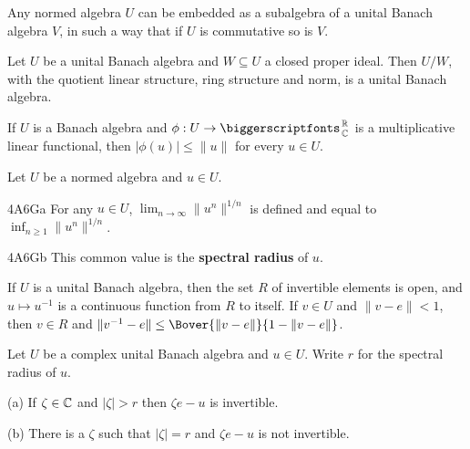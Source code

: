  Any normed algebra $U$ can be embedded as
a subalgebra of a unital Banach algebra $V$, in such a way that if $U$
is commutative so is $V$.   

 Let $U$ be a unital Banach algebra and
$W\subseteq U$ a closed proper ideal.   Then $U/W$, with the quotient
linear structure, ring structure and norm, is a unital Banach algebra.

 If $U$ is a Banach algebra and
$\phi:U\to\RoverC$ is a multiplicative linear functional, then
$|\phi(u)|\le\|u\|$ for every $u\in U$.


 Let $U$ be a normed algebra and $u\in U$.

\spheader 4A6Ga For any $u\in U$, $\lim_{n\to\infty}\|u^n\|^{1/n}$
is defined and equal to $\inf_{n\ge 1}\|u^n\|^{1/n}$.

\spheader 4A6Gb This common value is the {\bf spectral
radius} of $u$.

 If $U$ is a unital Banach algebra,
then the set $R$ of invertible elements is open, and
$u\mapsto u^{-1}$ is a continuous function from $R$ to itself.   
If $v\in U$ and $\|v-e\|<1$, then $v\in R$ and
$\|v^{-1}-e\|\le\Bover{\|v-e\|}{1-\|v-e\|}$.

 Let $U$ be a complex unital Banach algebra and
$u\in U$.   Write $r$ for the spectral radius of $u$.

(a) If $\zeta\in\Bbb C$ and $|\zeta|>r$ then $\zeta e-u$ is invertible.

(b) There is a $\zeta$ such that $|\zeta|=r$ and $\zeta e-u$ is not
invertible.


